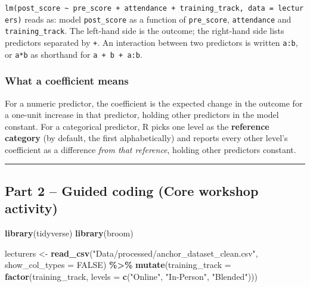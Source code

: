 \documentclass[11pt]{article}
\newenvironment{Shaded}{\begin{snugshade}}{\end{snugshade}}
\newcommand{\AttributeTok}[1]{\textcolor[rgb]{0.13,0.29,0.53}{#1}}
\newcommand{\ConstantTok}[1]{\textcolor[rgb]{0.56,0.35,0.01}{#1}}
\newcommand{\FunctionTok}[1]{\textcolor[rgb]{0.13,0.29,0.53}{\textbf{#1}}}
\newcommand{\NormalTok}[1]{#1}
\newcommand{\OtherTok}[1]{\textcolor[rgb]{0.56,0.35,0.01}{#1}}
\newcommand{\SpecialCharTok}[1]{\textcolor[rgb]{0.81,0.36,0.00}{\textbf{#1}}}
\newcommand{\StringTok}[1]{\textcolor[rgb]{0.31,0.60,0.02}{#1}}
\begin{document}
\texttt{lm(post\_score\ \textasciitilde{}\ pre\_score\ +\ attendance\ +\ training\_track,\ data\ =\ lecturers)}
reads as: model \texttt{post\_score} as a function of
\texttt{pre\_score}, \texttt{attendance} and \texttt{training\_track}.
The left-hand side is the outcome; the right-hand side lists predictors
separated by \texttt{+}. An interaction between two predictors is
written \texttt{a:b}, or \texttt{a*b} as shorthand for
\texttt{a\ +\ b\ +\ a:b}.

\hypertarget{what-a-coefficient-means}{%
\subsubsection{What a coefficient
means}\label{what-a-coefficient-means}}

For a numeric predictor, the coefficient is the expected change in the
outcome for a one-unit increase in that predictor, holding other
predictors in the model constant. For a categorical predictor, R picks
one level as the \textbf{reference category} (by default, the first
alphabetically) and reports every other level's coefficient as a
difference \emph{from that reference}, holding other predictors
constant.

\begin{center}\rule{0.5\linewidth}{0.5pt}\end{center}

\hypertarget{part-2-guided-coding-core-workshop-activity}{%
\subsection{Part 2 -- Guided coding (Core workshop
activity)}\label{part-2-guided-coding-core-workshop-activity}}

\begin{Shaded}
\begin{Highlighting}[]
\FunctionTok{library}\NormalTok{(tidyverse)}
\FunctionTok{library}\NormalTok{(broom)}

\NormalTok{lecturers }\OtherTok{\textless{}{-}} \FunctionTok{read\_csv}\NormalTok{(}\StringTok{"Data/processed/anchor\_dataset\_clean.csv"}\NormalTok{, }\AttributeTok{show\_col\_types =} \ConstantTok{FALSE}\NormalTok{) }\SpecialCharTok{\%\textgreater{}\%}
  \FunctionTok{mutate}\NormalTok{(}\AttributeTok{training\_track =} \FunctionTok{factor}\NormalTok{(training\_track, }\AttributeTok{levels =} \FunctionTok{c}\NormalTok{(}\StringTok{"Online"}\NormalTok{, }\StringTok{"In{-}Person"}\NormalTok{, }\StringTok{"Blended"}\NormalTok{)))}
\end{Highlighting}
\end{Shaded}
\end{document}
